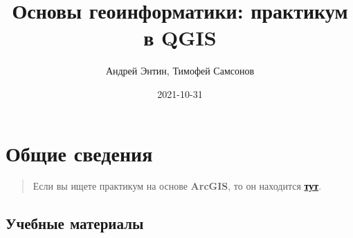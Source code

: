 \documentclass[
  12pt,
]{book}
\title{Основы геоинформатики: практикум в QGIS}
\author{Андрей Энтин, Тимофей Самсонов}
\date{2021-10-31}
\begin{document}
\maketitle

{
\hypersetup{linkcolor=}
\setcounter{tocdepth}{1}
\tableofcontents
}
\hypertarget{ux43eux431ux449ux438ux435-ux441ux432ux435ux434ux435ux43dux438ux44f}{%
\chapter*{Общие сведения}\label{ux43eux431ux449ux438ux435-ux441ux432ux435ux434ux435ux43dux438ux44f}}

\begin{quote}
Если вы ищете практикум на основе \textbf{ArcGIS}, то он находится \href{https://tsamsonov.github.io/arcgis-course/}{\textbf{тут}}.
\end{quote}

\hypertarget{ux443ux447ux435ux431ux43dux44bux435-ux43cux430ux442ux435ux440ux438ux430ux43bux44b}{%
\section*{Учебные материалы}\label{ux443ux447ux435ux431ux43dux44bux435-ux43cux430ux442ux435ux440ux438ux430ux43bux44b}}
\end{document}
